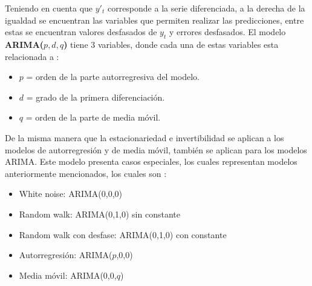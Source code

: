 Teniendo en cuenta que $y'_t$ corresponde a la serie diferenciada, a la derecha de la igualdad se encuentran las variables que permiten realizar las predicciones, entre estas se encuentran valores desfasados de $y_t$ y errores desfasados.
El modelo \textbf{ARIMA($p,d,q$)} tiene 3 variables, donde cada una de estas variables esta relacionada a \cite{forecast-time-series-arima}:
\begin{itemize}
    \item $p$ = orden de la parte autorregresiva del modelo.
    \item $d$ = grado de la primera diferenciación.
    \item $q$ = orden de la parte de media móvil.
\end{itemize}

De la misma manera que la estacionariedad e invertibilidad se aplican a los modelos de autorregresión y de media móvil, también se aplican para los modelos ARIMA. Este modelo presenta casos especiales, los cuales representan modelos anteriormente mencionados, los cuales son \cite{series-de-tiempo-sarima2}:
\begin{itemize}
    \item White noise: ARIMA(0,0,0)
    \item Random walk: ARIMA(0,1,0) sin constante
    \item Random walk con desfase: ARIMA(0,1,0) con constante
    \item Autorregresión: ARIMA($p$,0,0)
    \item Media móvil: ARIMA(0,0,$q$)
\end{itemize}

